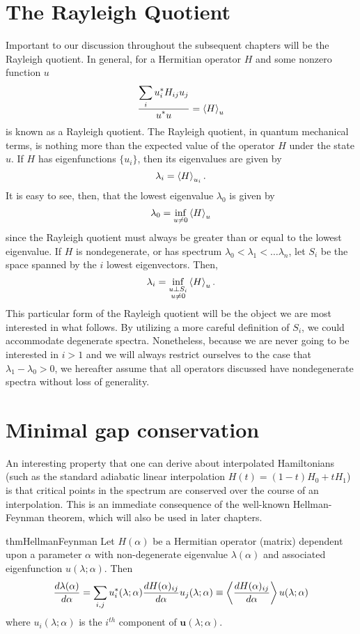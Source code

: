 \section{The Rayleigh Quotient}
  Important to our discussion throughout the subsequent chapters will be the Rayleigh quotient. In general, for a Hermitian operator $H$ and some nonzero function $u$
  \[
    \frac{\displaystyle \sum_i u^*_i H_{ij} u_j}{\displaystyle u^* u} = \left \langle H \right \rangle_u
  \]
  is known as a Rayleigh quotient. The Rayleigh quotient, in quantum mechanical terms, is nothing more than the expected value of the operator $H$ under the state $u$. If $H$ has eigenfunctions $\{u_i\}$, then its eigenvalues are given by
  \[
      \lambda_i = \left \langle H \right \rangle_{u_i}.
  \]
    It is easy to see, then, that the lowest eigenvalue $\lambda_0$ is given by
  \[
        \lambda_0 = \inf_{u \neq 0} \left \langle H \right \rangle_u
  \]
  since the Rayleigh quotient must always be greater than or equal to the lowest eigenvalue. If $H$ is nondegenerate, or has spectrum $\lambda_0 < \lambda_1 < \dots \lambda_n$, let $S_i$ be the space spanned by the $i$ lowest eigenvectors. Then, 
  \begin{equation}\label{eqn:Rayleigh-eigenvalue}
        \lambda_i = \inf_{\substack{u \perp S_i \\ u \neq 0}} \left \langle H \right \rangle_u.
  \end{equation}
  This particular form of the Rayleigh quotient will be the object we are most interested in what follows. By utilizing a more careful definition of $S_i$, we could accommodate degenerate spectra. Nonetheless, because we are never going to be interested in $i>1$ and we will always restrict ourselves to the case that $\lambda_1 -\lambda_0 > 0$, we hereafter assume that all operators discussed have nondegenerate spectra without loss of generality.  
  
\section{Minimal gap conservation}
An interesting property that one can derive about interpolated Hamiltonians (such as the standard adiabatic linear interpolation $H(t) = (1-t)H_0 + t H_1$) is that critical points in the spectrum are conserved over the course of an interpolation. This is an immediate consequence of the well-known Hellman-Feynman theorem, which will also be used in later chapters.
    \begin{restatable}{thm}{HellmanFeynman}
      \label{thm:Hellman-Feynman}
      Let $H(\alpha)$ be a Hermitian operator (matrix) dependent upon a parameter $\alpha$ with non-degenerate eigenvalue $\lambda(\alpha)$ and associated eigenfunction $u(\lambda;\alpha)$. Then
    \[
      \frac{d \lambda(\alpha)}{d \alpha}  = \sum_{i,j} u_i^*(\lambda;\alpha) \frac{d H(\alpha)_{ij}}{d \alpha} u_j(\lambda;\alpha) \equiv \left \langle \frac{d H(\alpha)_{ij}}{d \alpha} \right \rangle{u(\lambda;\alpha)}
    \]
    where $u_i(\lambda;\alpha)$ is the $i^{th}$ component of $\mathbf{u}(\lambda;\alpha)$. 
    \end{restatable}
    
